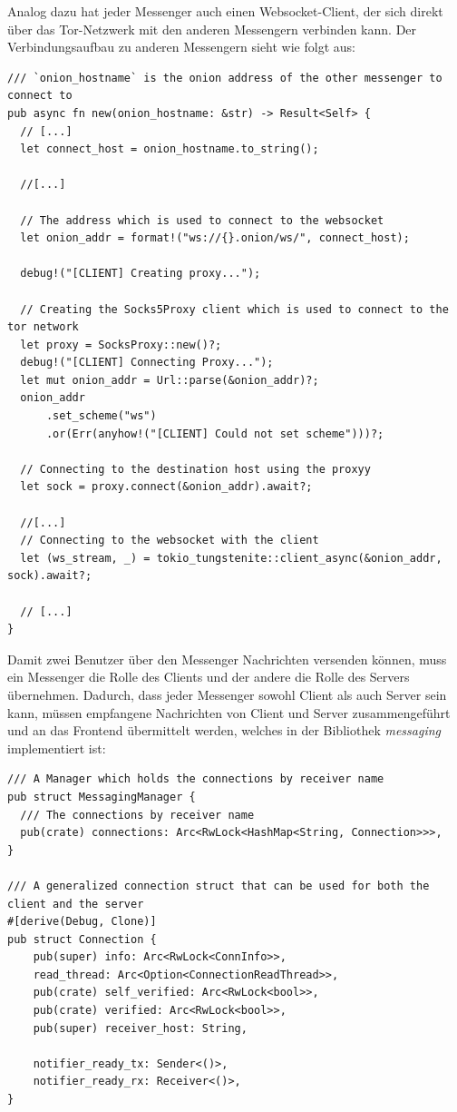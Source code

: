 \documentclass[a4paper,ngerman, headheight=28pt,12pt]{scrartcl}
\begin{document}
Analog dazu hat jeder Messenger auch einen Websocket-Client, der sich direkt über das Tor-Netzwerk mit den anderen Messengern verbinden kann. Der Verbindungsaufbau zu anderen Messengern sieht wie folgt aus:
\begin{verbatim}
/// `onion_hostname` is the onion address of the other messenger to connect to
pub async fn new(onion_hostname: &str) -> Result<Self> {
  // [...]
  let connect_host = onion_hostname.to_string();

  //[...]

  // The address which is used to connect to the websocket
  let onion_addr = format!("ws://{}.onion/ws/", connect_host);

  debug!("[CLIENT] Creating proxy...");

  // Creating the Socks5Proxy client which is used to connect to the tor network
  let proxy = SocksProxy::new()?;
  debug!("[CLIENT] Connecting Proxy...");
  let mut onion_addr = Url::parse(&onion_addr)?;
  onion_addr
      .set_scheme("ws")
      .or(Err(anyhow!("[CLIENT] Could not set scheme")))?;

  // Connecting to the destination host using the proxyy
  let sock = proxy.connect(&onion_addr).await?;

  //[...]
  // Connecting to the websocket with the client
  let (ws_stream, _) = tokio_tungstenite::client_async(&onion_addr, sock).await?;

  // [...]
}
\end{verbatim}
Damit zwei Benutzer über den Messenger Nachrichten versenden können, muss ein Messenger die Rolle des Clients und der andere die Rolle des Servers übernehmen. Dadurch, dass jeder Messenger sowohl Client als auch Server sein kann, müssen empfangene Nachrichten von Client und Server zusammengeführt und an das Frontend übermittelt werden, welches in der Bibliothek \textit{messaging} implementiert ist:
\begin{verbatim}
/// A Manager which holds the connections by receiver name
pub struct MessagingManager {
  /// The connections by receiver name
  pub(crate) connections: Arc<RwLock<HashMap<String, Connection>>>,
}

/// A generalized connection struct that can be used for both the client and the server
#[derive(Debug, Clone)]
pub struct Connection {
    pub(super) info: Arc<RwLock<ConnInfo>>,
    read_thread: Arc<Option<ConnectionReadThread>>,
    pub(crate) self_verified: Arc<RwLock<bool>>,
    pub(crate) verified: Arc<RwLock<bool>>,
    pub(super) receiver_host: String,

    notifier_ready_tx: Sender<()>,
    notifier_ready_rx: Receiver<()>,
}
\end{verbatim}
\end{document}
